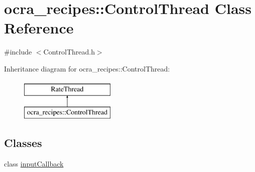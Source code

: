 \hypertarget{classocra__recipes_1_1ControlThread}{}\section{ocra\+\_\+recipes\+:\+:Control\+Thread Class Reference}
\label{classocra__recipes_1_1ControlThread}


{\ttfamily \#include $<$Control\+Thread.\+h$>$}

Inheritance diagram for ocra\+\_\+recipes\+:\+:Control\+Thread\+:\begin{figure}[H]
\begin{center}
\leavevmode
\includegraphics[height=2.000000cm]{d5/d2f/classocra__recipes_1_1ControlThread}
\end{center}
\end{figure}
\subsection*{Classes}
\begin{DoxyCompactItemize}
\item 
class \hyperlink{classocra__recipes_1_1ControlThread_1_1inputCallback}{input\+Callback}
\end{DoxyCompactItemize}
